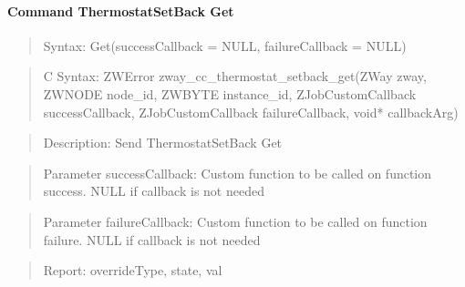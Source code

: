 \paragraph{Command ThermostatSetBack Get}
\begin{quote}Syntax: Get(successCallback = NULL, failureCallback = NULL)\end{quote}
\begin{quote}C Syntax: ZWError zway\_cc\_thermostat\_setback\_get(ZWay zway, ZWNODE node\_id, ZWBYTE instance\_id, ZJobCustomCallback successCallback, ZJobCustomCallback failureCallback, void* callbackArg)\end{quote}
\begin{quote}Description: Send ThermostatSetBack Get\end{quote}
\begin{quote}Parameter successCallback: Custom function to be called on function success. NULL if callback is not needed\end{quote}
\begin{quote}Parameter failureCallback: Custom function to be called on function failure. NULL if callback is not needed\end{quote}
\begin{quote}Report: overrideType, state, val\end{quote}

